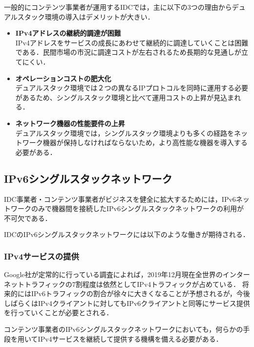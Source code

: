 一般的にコンテンツ事業者が運用するIDCでは，主に以下の3つの理由からデュアルスタック環境の導入はデメリットが大きい．

\begin{itemize}
    \item \textbf{IPv4アドレスの継続的調達が困難} \\
    IPv4アドレスをサービスの成長にあわせて継続的に調達していくことは困難である．民間市場の市況に調達コストが左右されるため長期的な見通しが立てにくい．
    \item \textbf{オペレーションコストの肥大化}\\
デュアルスタック環境では２つの異なるIPプロトコルを同時に運用する必要があるため、シングルスタック環境と比べて運用コストの上昇が見込まれる\cite{北口善明2017クライアント}．
    \item \textbf{ネットワーク機器の性能要件の上昇}\\
デュアルスタック環境では，シングルスタック環境よりも多くの経路をネットワーク機器が保持しなければならないため，より高性能な機器を導入する必要がある．
\end{itemize}



\subsection{IPv6シングルスタックネットワーク}
\label{introduction:background:IPv6-single-stack-network}
IDC事業者・コンテンツ事業者がビジネスを健全に拡大するためには，IPv6ネットワークのみで機器間を接続したIPv6シングルスタックネットワークの利用が不可欠である．

IDCのIPv6シングルスタックネットワークには以下のような働きが期待される．


\subsubsection{IPv4サービスの提供}
\label{introduction:background:IPv6-single-stack-network:ipv4-service}
Google社が定常的に行っている調査\cite{Google_IPv6_statistics}によれば，2019年12月現在全世界のインターネットトラフィックの7割程度は依然としてIPv4トラフィックが占めている．
将来的にはIPv6トラフィックの割合が徐々に大きくなることが予想されるが，今後しばらくはIPv4クライアントに対してもIPv6クライアントと同等にサービス提供を行っていくことが必要とされる．

コンテンツ事業者のIPv6シングルスタックネットワークにおいても，何らかの手段を用いてIPv4サービスを継続して提供する機構を備える必要がある．

